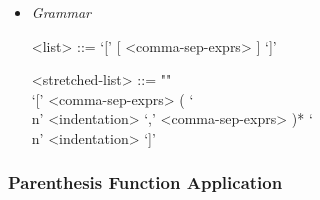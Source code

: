 \documentclass{article}
\begin{document}
\begin{itemize}
\item \textit{Grammar}
\begin{grammar}
<list> ::= `[' [ <comma-sep-exprs> ] `]'

<stretched-list> ::= ""\\
`[' <comma-sep-exprs>
( `\\n' <indentation> `,' <comma-sep-exprs> )*
`\\n' <indentation> `]'
\end{grammar}

\end{itemize}

\subsubsection{Parenthesis Function Application}
\label{subsec:parenfuncapp}
\end{document}
